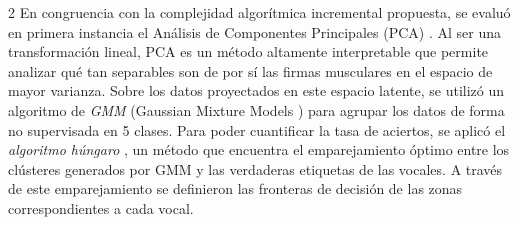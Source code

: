 \documentclass[11pt, letterpaper]{article}
\begin{document}
\begin{multicols*}{2}
En congruencia con la complejidad algorítmica incremental propuesta, se evaluó en primera instancia el Análisis de Componentes Principales (PCA) \cite{jolliffe2002}. Al ser una transformación lineal, PCA es un método altamente interpretable que permite analizar qué tan separables son de por sí las firmas musculares en el espacio de mayor varianza. Sobre los datos proyectados en este espacio latente, se utilizó un algoritmo de  \textit{GMM} (Gaussian Mixture Models \cite{sklearn_gmm}) para agrupar los datos de forma no supervisada en 5 clases. Para poder cuantificar la tasa de aciertos, se aplicó el \textit{algoritmo húngaro} \cite{kuhn1955}, un método que encuentra el emparejamiento óptimo entre los clústeres generados por GMM y las verdaderas etiquetas de las vocales. A través de este emparejamiento se definieron las fronteras de decisión de las zonas correspondientes a cada vocal.



\end{multicols*}
\end{document}
